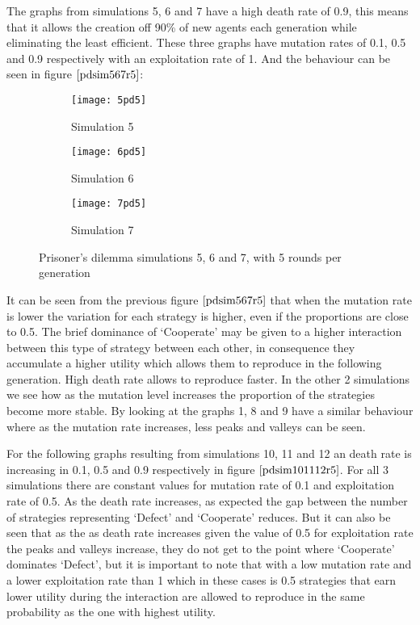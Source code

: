 The graphs from simulations 5, 6 and 7  have a high death rate of 0.9, this means that it allows the creation off 90\% of new agents each generation while eliminating the least efficient. These three graphs have mutation rates of 0.1, 0.5 and 0.9 respectively with an exploitation rate of 1. And the behaviour can be seen  in figure $\ref{pdsim567r5}$:

\begin{figure}[H]       
    \centering
    \begin{subfigure}[b]{0.3\textwidth}
	\centering
	{\texttt{[image: 5pd5]}}   
    	\caption{Simulation 5}
	\label{fig:pds5}
    \end{subfigure}
    \hfill
    \begin{subfigure}[b]{0.3\textwidth}
	\centering
	{\texttt{[image: 6pd5]}}   
    	\caption{Simulation 6}
	\label{fig:pds6}
    \end{subfigure}
    \hfill
    \begin{subfigure}[b]{0.3\textwidth}
	\centering
	{\texttt{[image: 7pd5]}}   
    	\caption{Simulation 7}
	\label{fig:pds7}
    \end{subfigure}
    \caption{Prisoner's dilemma simulations 5, 6 and 7, with 5 rounds per generation}
    \label{pdsim567r5}
\end{figure}

It can be seen from the previous figure $\ref{pdsim567r5}$ that when the mutation rate is lower the variation for each strategy is higher, even if the proportions are close to 0.5. The brief dominance of `Cooperate' may be given to a higher interaction between this type of strategy between each other, in consequence they accumulate a higher utility which allows them to reproduce in the following generation. High death rate allows to  reproduce faster.  In the other 2 simulations we see how as the mutation level increases the proportion of the strategies become more stable. By looking at the graphs 1, 8 and 9 have a similar behaviour where as the mutation rate increases, less peaks and valleys can be seen.



For the following graphs resulting from simulations 10, 11 and 12 an death rate is increasing in 0.1, 0.5 and 0.9 respectively in figure $\ref{pdsim101112r5}$. For all 3 simulations there are constant values for mutation rate of 0.1 and exploitation rate of 0.5. As the death rate increases, as expected the gap between the number of strategies representing `Defect' and `Cooperate' reduces. But it can also be seen that as the as death rate increases given the value of 0.5 for exploitation rate the peaks and valleys increase, they do not get to the point where `Cooperate' dominates `Defect', but it is important to note that with a low mutation rate and a lower exploitation rate than 1 which in these cases is 0.5 strategies that earn lower utility during the interaction are allowed to reproduce in the same probability as the one with highest utility. 

